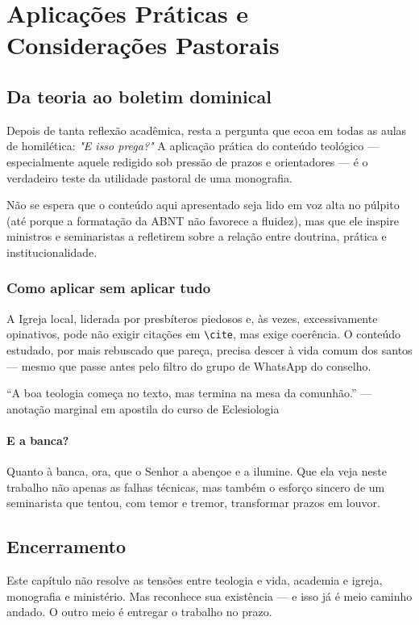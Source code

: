 \chapter{Aplicações Práticas e Considerações Pastorais}
\label{cap:aplicacoes}

\section{Da teoria ao boletim dominical}

Depois de tanta reflexão acadêmica, resta a pergunta que ecoa em todas as aulas de homilética: \textit{"E isso prega?"} A aplicação prática do conteúdo teológico — especialmente aquele redigido sob pressão de prazos e orientadores — é o verdadeiro teste da utilidade pastoral de uma monografia. 

Não se espera que o conteúdo aqui apresentado seja lido em voz alta no púlpito (até porque a formatação da ABNT não favorece a fluidez), mas que ele inspire ministros e seminaristas a refletirem sobre a relação entre doutrina, prática e institucionalidade.

\subsection{Como aplicar sem aplicar tudo}

A Igreja local, liderada por presbíteros piedosos e, às vezes, excessivamente opinativos, pode não exigir citações em \texttt{\textbackslash cite}, mas exige coerência. O conteúdo estudado, por mais rebuscado que pareça, precisa descer à vida comum dos santos — mesmo que passe antes pelo filtro do grupo de WhatsApp do conselho.

\begin{citacao}
``A boa teologia começa no texto, mas termina na mesa da comunhão.'' — anotação marginal em apostila do curso de Eclesiologia
\end{citacao}

\subsubsection*{E a banca?}

Quanto à banca, ora, que o Senhor a abençoe e a ilumine. Que ela veja neste trabalho não apenas as falhas técnicas, mas também o esforço sincero de um seminarista que tentou, com temor e tremor, transformar prazos em louvor.

\section{Encerramento}

Este capítulo não resolve as tensões entre teologia e vida, academia e igreja, monografia e ministério. Mas reconhece sua existência — e isso já é meio caminho andado. O outro meio é entregar o trabalho no prazo. 
